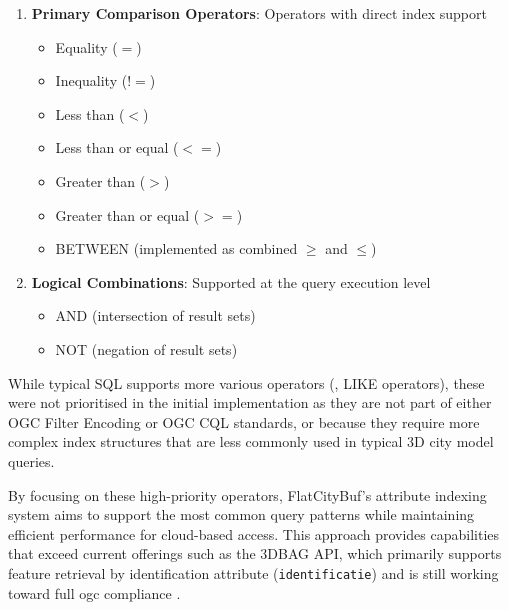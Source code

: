 \begin{enumerate}
  \item \textbf{Primary Comparison Operators}: Operators with direct index support
    \begin{itemize}
      \item Equality ($=$)
      \item Inequality ($!=$)
      \item Less than ($<$)
      \item Less than or equal ($<=$)
      \item Greater than ($>$)
      \item Greater than or equal ($>=$)
      \item BETWEEN (implemented as combined $\geq$ and $\leq$)
    \end{itemize}

  \item \textbf{Logical Combinations}: Supported at the query execution level
    \begin{itemize}
      \item AND (intersection of result sets)
      \item NOT (negation of result sets)
    \end{itemize}

\end{enumerate}

While typical SQL supports more various operators (\eg, LIKE operators), these were not prioritised in the initial implementation as they are not part of either OGC Filter Encoding or OGC CQL standards, or because they require more complex index structures that are less commonly used in typical 3D city model queries.

By focusing on these high-priority operators, FlatCityBuf's attribute indexing system aims to support the most common query patterns while maintaining efficient performance for cloud-based access. This approach provides capabilities that exceed current offerings such as the 3DBAG API, which primarily supports feature retrieval by identification attribute (\texttt{identificatie}) and is still working toward full \ac{ogc} compliance \citep{3dbag_api}.


